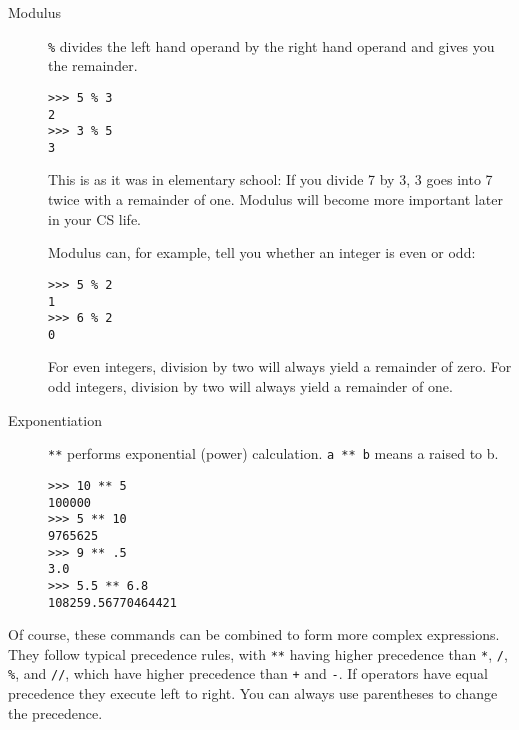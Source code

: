\documentclass[11pt]{cselabheader}
\begin{document}
\begin{description}
  \item[Modulus] \texttt{\%} divides the left hand operand by the right hand
    operand and gives you the remainder.

    \begin{lstlisting}[style=bash]
>>> 5 % 3
2
>>> 3 % 5
3
    \end{lstlisting}

    This is as it was in elementary school: If you divide 7 by 3, 3 goes into 7
    twice with a remainder of one. Modulus will become more important later in
    your CS life.

    Modulus can, for example, tell you whether an integer is even or odd:
    \begin{lstlisting}[style=bash]
>>> 5 % 2
1
>>> 6 % 2
0
    \end{lstlisting}
    For even integers, division by two will always yield a remainder of zero.
    For odd integers, division by two will always yield a remainder of one.

  \item[Exponentiation] \texttt{**} performs exponential (power) calculation.
    \texttt{a ** b} means a raised to b.

    \begin{lstlisting}[style=bash]
>>> 10 ** 5
100000
>>> 5 ** 10 
9765625
>>> 9 ** .5
3.0
>>> 5.5 ** 6.8
108259.56770464421
    \end{lstlisting}

%
%
\end{description}

Of course, these commands can be combined to form more complex expressions. They
follow typical precedence rules, with \texttt{**} having higher precedence than
\texttt{*}, \texttt{/}, \texttt{\%}, and \texttt{//}, which have higher
precedence than \texttt{+} and \texttt{-}. If operators have equal precedence
they execute left to right. You can always use parentheses to change the
precedence.
\end{document}
